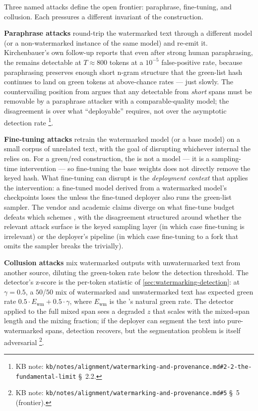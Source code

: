 Three named attacks define the open frontier: paraphrase, fine-tuning,
and collusion. Each pressures a different invariant of the construction.

\textbf{Paraphrase attacks} round-trip the watermarked text through a
different model (or a non-watermarked instance of the same model) and
re-emit it. Kirchenbauer's own follow-up
reports that even after strong human paraphrasing, the 
remains detectable at $T \approx 800$ tokens at a $10^{-5}$
false-positive rate, because paraphrasing preserves enough short
n-gram structure that the green-list hash continues to land on green
tokens at above-chance rates --- just slowly. The countervailing
position from \citet{sadasivan2023-detection}
argues that any  detectable from \emph{short} spans must be
removable by a paraphrase attacker with a comparable-quality model;
the disagreement is over what ``deployable'' requires, not over the
asymptotic detection rate%
\footnote{KB note: \nolinkurl{kb/notes/alignment/watermarking-and-provenance.md#2-2-the-fundamental-limit}
\S~2.2.}.

\textbf{Fine-tuning attacks} retrain the watermarked model (or a base
model) on a small corpus of unrelated text, with the goal of disrupting
whichever internal  the  relies on. For a green/red
construction, the  is not a model  --- it is a
sampling-time intervention --- so fine-tuning the base weights does
not directly remove the keyed hash. What fine-tuning can disrupt is
the \emph{deployment context} that applies the intervention: a
fine-tuned model derived from a watermarked model's checkpoints loses
the  unless the fine-tuned deployer also runs the
green-list sampler. The vendor and academic claims diverge on what
fine-tune budget defeats which schemes
, with the
disagreement structured around whether the relevant attack surface is
the keyed sampling layer (in which case fine-tuning is irrelevant) or
the deployer's pipeline (in which case fine-tuning to a fork that
omits the sampler breaks the  trivially).

\textbf{Collusion attacks} mix watermarked outputs with unwatermarked
text from another source, diluting the green-token rate below the
detection threshold. The detector's z-score is the per-token statistic
of \cref{sec:watermarking-detection}: at $\gamma = 0.5$, a $50$/$50$
mix of watermarked and unwatermarked text has expected green rate
$0.5 \cdot E_{\mathrm{wm}} + 0.5 \cdot \gamma$, where $E_{\mathrm{wm}}$
is the 's natural green rate. The detector applied to the
full mixed span sees a degraded $z$ that scales with the mixed-span
length and the mixing fraction; if the deployer can segment the text
into pure-watermarked spans, detection recovers, but the segmentation
problem is itself adversarial%
\footnote{KB note: \nolinkurl{kb/notes/alignment/watermarking-and-provenance.md#5}
\S~5 (frontier).}.

